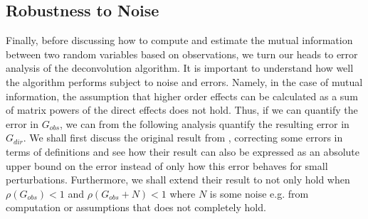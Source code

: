 \documentclass[../Thesis.tex]{subfiles}
\begin{document}
\subsection{Robustness to Noise}\label{subseq:Robustness to noise}
Finally, before discussing how to compute and estimate the mutual information between two random variables based on observations, we turn our heads to error analysis of the deconvolution algorithm. It is important to understand how well the algorithm performs subject to noise and errors. Namely, in the case of mutual information, the assumption that higher order effects can be calculated as a sum of matrix powers of the direct effects does not hold. Thus, if we can quantify the error in $G_{obs}$, we can from the following analysis quantify the resulting error in $G_{dir}$. We shall first discuss the original result from \cite{Network-deconvolution-as-a-general-method-to-distinguish-direct-dependencies-in-networks}, correcting some errors in terms of definitions and see how their result can also be expressed as an absolute upper bound on the error instead of only how this error behaves for small perturbations. Furthermore, we shall extend their result to not only hold when $\rho\left(G_{obs}\right) < 1$ and $\rho\left(G_{obs} + N\right) < 1$ where $N$ is some noise e.g. from computation or assumptions that does not completely hold.

\end{document}
